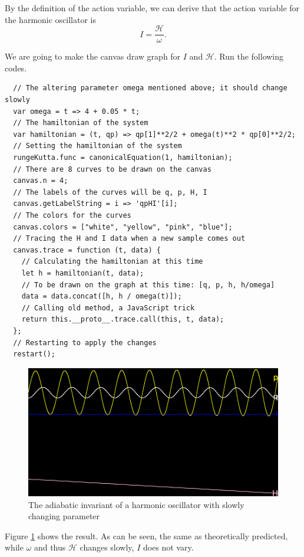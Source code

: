 \documentclass[12pt]{article}
\begin{document}
By the definition of the action variable,
we can derive that the action variable for the harmonic oscillator is \cite[p. 300]{arnold1989mathmech}\cite[p. 157]{landau1976mechanics}
\begin{equation*}
  I=\frac{\mathcal H}\omega.
\end{equation*}

We are going to make the canvas draw graph for $I$ and $\mathcal H$.
Run the following codes.

\begin{verbatim}
  // The altering parameter omega mentioned above; it should change slowly
  var omega = t => 4 + 0.05 * t;
  // The hamiltonian of the system
  var hamiltonian = (t, qp) => qp[1]**2/2 + omega(t)**2 * qp[0]**2/2;
  // Setting the hamiltonian of the system
  rungeKutta.func = canonicalEquation(1, hamiltonian);
  // There are 8 curves to be drawn on the canvas
  canvas.n = 4;
  // The labels of the curves will be q, p, H, I
  canvas.getLabelString = i => 'qpHI'[i];
  // The colors for the curves
  canvas.colors = ["white", "yellow", "pink", "blue"];
  // Tracing the H and I data when a new sample comes out
  canvas.trace = function (t, data) {
    // Calculating the hamiltonian at this time
    let h = hamiltonian(t, data);
    // To be drawn on the graph at this time: [q, p, h, h/omega]
    data = data.concat([h, h / omega(t)]);
    // Calling old method, a JavaScript trick
    return this.__proto__.trace.call(this, t, data);
  };
  // Restarting to apply the changes
  restart();
\end{verbatim}

\begin{figure}[h]
  \centering
  \includegraphics[width=0.6\linewidth]{adiabatic.png}
  \caption{The adiabatic invariant of a harmonic oscillator with slowly changing parameter}
  \label{fig:adiabatic}
\end{figure}

Figure \ref{fig:adiabatic} shows the result.
As can be seen, the same as theoretically predicted,
while $\omega$ and thus $\mathcal H$ changes slowly, $I$ does not vary.
\end{document}

